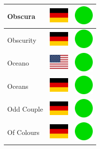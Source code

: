 \documentclass[12pt, a4paper, twoside]{report}
\begin{document}
\begin{center}
\begin{longtable}{|p{5cm}|p{2cm}|p{2cm}|}
 Obscura                                                    & \includegraphics[width=1cm]{../4x3/de} &   \includegraphics[width=1cm]{../likes/y} \\ \hline
 Obscurity                                                  & \includegraphics[width=1cm]{../4x3/de} &   \includegraphics[width=1cm]{../likes/y} \\ \hline
 Oceano                                                     & \includegraphics[width=1cm]{../4x3/us} &   \includegraphics[width=1cm]{../likes/y} \\ \hline
 Oceans                                                     & \includegraphics[width=1cm]{../4x3/de} &   \includegraphics[width=1cm]{../likes/y} \\ \hline
 Odd Couple                                                 & \includegraphics[width=1cm]{../4x3/de} &   \includegraphics[width=1cm]{../likes/y} \\ \hline
 Of Colours                                                 & \includegraphics[width=1cm]{../4x3/de} &   \includegraphics[width=1cm]{../likes/y} \\ \hline

\end{longtable}
\end{center}
\end{document}
